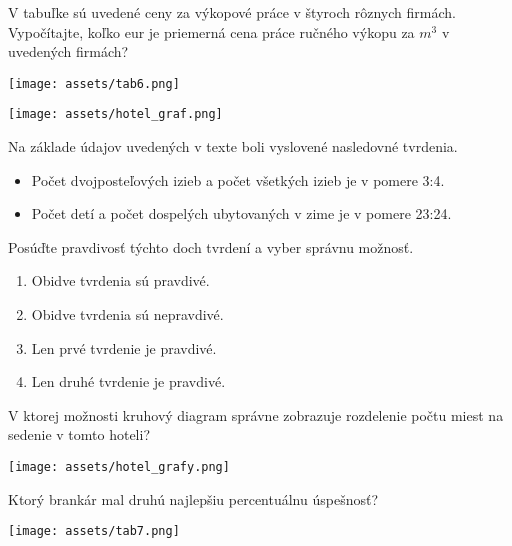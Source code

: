 \begin{example}
	V tabuľke sú uvedené ceny za výkopové práce v štyroch rôznych firmách. Vypočítajte, koľko eur je priemerná cena práce ručného výkopu za $m^3$ v uvedených firmách?
	
	\begin{center}
		\texttt{[image: assets/tab6.png]}
	\end{center}
\end{example}

\begin{center}
	\texttt{[image: assets/hotel\_graf.png]}
\end{center}

\begin{example}
	Na základe údajov uvedených v texte boli vyslovené nasledovné tvrdenia.
	
	\begin{itemize}
		\item Počet dvojposteľových izieb a počet všetkých izieb je v pomere 3:4.
		\item Počet detí a počet dospelých ubytovaných v zime je v pomere 23:24.
	\end{itemize}
	
	Posúďte pravdivosť týchto doch tvrdení a vyber správnu možnosť.
	
	\begin{enumerate}
		\item Obidve tvrdenia sú pravdivé.
		\item Obidve tvrdenia sú nepravdivé.
		\item Len prvé tvrdenie je pravdivé.
		\item Len druhé tvrdenie je pravdivé.
	\end{enumerate}
\end{example}

\begin{example}
	V ktorej možnosti kruhový diagram správne zobrazuje rozdelenie počtu miest na sedenie v tomto hoteli?
	
	\begin{center}
		\texttt{[image: assets/hotel\_grafy.png]}
	\end{center}
\end{example}

\begin{example}
	Ktorý brankár mal druhú najlepšiu percentuálnu úspešnosť?
	
	\begin{center}
		\texttt{[image: assets/tab7.png]}
	\end{center}
\end{example}

